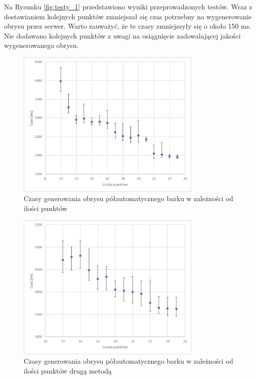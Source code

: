 \documentclass[a4paper,11pt,twoside,openright]{report}
\theoremstyle{definition}
\begin{document}
Na Rysunku \ref{fig:testy_1} przedstawiono wyniki przeprowadzonych testów. Wraz z dostawianiem kolejnych punktów zmniejszał się czas potrzebny na wygenerowanie obrysu przez serwer. Warto zauważyć, że te czasy zmniejszyły się o około 150 ms. Nie dodawano kolejnych punktów z uwagi na osiągnięcie zadowalającej jakości wygenerowanego obrysu.

\begin{figure}[h!]
	\center
	\includegraphics[width=0.8\textwidth]{testy_2}
	\caption{Czasy generowania obrysu półautomatycznego barku w zależności od ilości punktów}
    	\label{fig:testy_2}
\end{figure}

\begin{figure}[htb!]
	\center
	\includegraphics[width=0.8\textwidth]{testy_3}
	\caption{Czasy generowania obrysu półautomatycznego barku w zależności od ilości punktów drugą metodą}
    	\label{fig:testy_3}
\end{figure}
\end{document}
